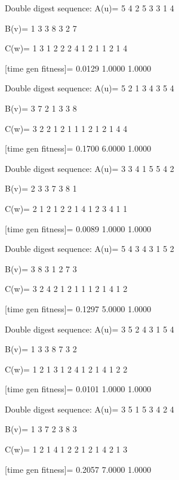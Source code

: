 Double digest sequence:
A(u)=
     5     4     2     5     3     3     1     4

B(v)=
     1     3     3     8     3     2     7

C(w)=
     1     3     1     2     2     2     4     1     2     1     1     2     1     4

[time gen fitness]=
    0.0129    1.0000    1.0000

Double digest sequence:
A(u)=
     5     2     1     3     4     3     5     4

B(v)=
     3     7     2     1     3     3     8

C(w)=
     3     2     2     1     2     1     1     1     2     1     2     1     4     4

[time gen fitness]=
    0.1700    6.0000    1.0000

Double digest sequence:
A(u)=
     3     3     4     1     5     5     4     2

B(v)=
     2     3     3     7     3     8     1

C(w)=
     2     1     2     1     2     2     1     4     1     2     3     4     1     1

[time gen fitness]=
    0.0089    1.0000    1.0000

Double digest sequence:
A(u)=
     5     4     3     4     3     1     5     2

B(v)=
     3     8     3     1     2     7     3

C(w)=
     3     2     4     2     1     2     1     1     1     2     1     4     1     2

[time gen fitness]=
    0.1297    5.0000    1.0000

Double digest sequence:
A(u)=
     3     5     2     4     3     1     5     4

B(v)=
     1     3     3     8     7     3     2

C(w)=
     1     2     1     3     1     2     4     1     2     1     4     1     2     2

[time gen fitness]=
    0.0101    1.0000    1.0000

Double digest sequence:
A(u)=
     3     5     1     5     3     4     2     4

B(v)=
     1     3     7     2     3     8     3

C(w)=
     1     2     1     4     1     2     2     1     2     1     4     2     1     3

[time gen fitness]=
    0.2057    7.0000    1.0000

